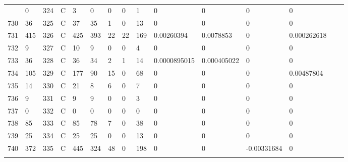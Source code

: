 \begin{longtable}{lllllllllllllll}
\begin{comment}
	729 & 0                 & 324 & C   & 3                 & 0                 & 0                 & 0    & 1          & 0              & 0              & 0             & 0            \\
	730 & 36                & 325 & C   & 37                & 35                & 1                 & 0    & 13         & 0              & 0              & 0             & 0            \\
	731 & 415               & 326 & C   & 425               & 393               & 22                & 22   & 169        & 0.00260394     & 0.0078853      & 0             & 0.000262618  \\
	732 & 9                 & 327 & C   & 10                & 9                 & 0                 & 0    & 4          & 0              & 0              & 0             & 0            \\
	733 & 36                & 328 & C   & 36                & 34                & 2                 & 1    & 14         & 0.0000895015   & 0.000405022    & 0             & 0            \\
	734 & 105               & 329 & C   & 177               & 90                & 15                & 0    & 68         & 0              & 0              & 0             & 0.00487804   \\
	735 & 14                & 330 & C   & 21                & 8                 & 6                 & 0    & 7          & 0              & 0              & 0             & 0            \\
	736 & 9                 & 331 & C   & 9                 & 9                 & 0                 & 0    & 3          & 0              & 0              & 0             & 0            \\
	737 & 0                 & 332 & C   & 0                 & 0                 & 0                 & 0    & 0          & 0              & 0              & 0             & 0            \\
	738 & 85                & 333 & C   & 85                & 78                & 7                 & 0    & 38         & 0              & 0              & 0             & 0            \\
	739 & 25                & 334 & C   & 25                & 25                & 0                 & 0    & 13         & 0              & 0              & 0             & 0            \\
	740 & 372               & 335 & C   & 445               & 324               & 48                & 0    & 198        & 0              & 0              & -0.00331684   & 0            \\

\end{comment}
\end{longtable}
